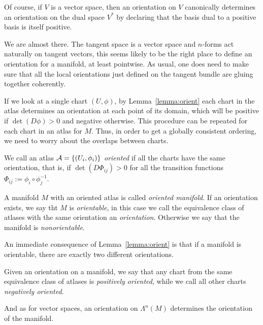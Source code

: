 \begin{remark}
  Of course, if $V$ is a vector space, then an orientation on $V$ canonically determines an orientation on the dual space $V^*$ by declaring that the basis dual to a positive basis is itself positive.
\end{remark}

We are almost there.
The tangent space is a vector space and $n$-forms act naturally on tangent vectors, this seems likely to be the right place to define an orientation for a manifold, at least pointwise.
As usual, one does need to make sure that all the local orientations just defined on the tangent bundle are gluing together coherently.

\begin{remark}
  If we look at a single chart $(U,\phi)$, by Lemma~\ref{lemma:orient} each chart in the atlas determines an orientation at each point of its domain, which will be positive if $\det(D\phi)>0$ and negative otherwise.
  This procedure can be repeated for each chart in an atlas for $M$.
  Thus, in order to get a globally consistent ordering, we need to worry about the overlaps between charts.
\end{remark}

\begin{definition}
  We call an atlas $\mathcal{A} = \{(U_i,\phi_i)\}$ \emph{oriented} if all the charts have the same orientation, that is, if $\det(D\Phi_{ij}) > 0$ for all the transition functions $\Phi_{ij} := \phi_i\circ\phi_j^{-1}$.

  A manifold $M$ with an oriented atlas is called \emph{oriented manifold}.
  If an orientation exists, we say tht $M$ is \emph{orientable}, in this case we call the equivalence class of atlases with the same orientation an \emph{orientation}.
  Otherwise we say that the manifold is \emph{nonorientable}.
\end{definition}

An immediate consequence of Lemma~\ref{lemma:orient} is that if a manifold is orientable, there are exactly two different orientations.

\begin{definition}
  Given an orientation on a manifold, we say that any chart from the same equivalence class of atlases is \emph{positively oriented}, while we call all other charts \emph{negatively oriented}.
\end{definition}

And as for vector spaces, an orientation on $\Lambda^n(M)$ determines the orientation of the manifold.

